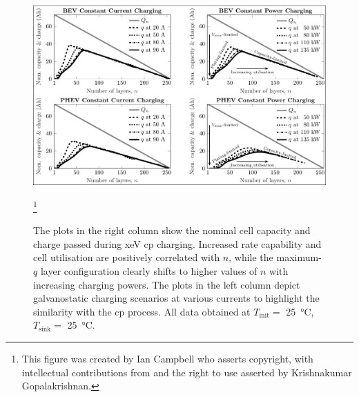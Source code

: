 \begin{figure}[!bp]
    \begin{minipage}[t]{\textwidth}
        \centering \includegraphics[width=\textwidth,trim=4 2 3 4,clip]{fig_capacity_quadrants.pdf}
        \caption[The plots  in the right  column show the nominal  cell capacity and  charge passed
        during \gls{xeV} \gls{cp} charging. Increased rate capability and cell utilisation are positively
        correlated with  $n$, while the  maximum-$q$ layer  configuration clearly shifts  to higher
        values  of $n$  with  increasing charging  powers.  The  plots in  the  left column  depict
        galvanostatic charging scenarios  at various currents to highlight the  similarity with the
        \gls{cp}  process.  All  data  obtained  at  $T_\text{init}  =$  \SI{25}{\degreeCelsius},
        $T_\text{sink} =$ \SI{25}{\degreeCelsius}.]{The plots  in the right  column show the nominal  cell capacity and  charge passed
            during \gls{xeV} \gls{cp} charging. Increased rate capability and cell utilisation are positively
            correlated with  $n$, while the  maximum-$q$ layer  configuration clearly shifts  to higher
            values  of $n$  with  increasing charging  powers.  The  plots in  the  left column  depict
            galvanostatic charging scenarios  at various currents to highlight the  similarity with the
            \gls{cp}  process.  All  data  obtained  at  $T_\text{init}  =$  \SI{25}{\degreeCelsius},
        $T_\text{sink} =$ \SI{25}{\degreeCelsius}\footnotemark.}\label{fig:fig_CapacityQuadrants}
        \mpfootnotes[1]
        \footnote{This figure was created by Ian Campbell who asserts copyright,
            with  intellectual  contributions  from  and   the  right  to  use  asserted  by
        Krishnakumar Gopalakrishnan.}
    \end{minipage}
\end{figure}

